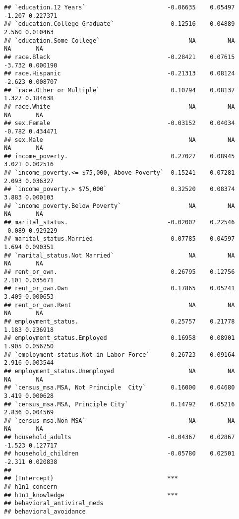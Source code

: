 \documentclass[
]{article}
\begin{document}
\begin{verbatim}
## `education.12 Years`                       -0.06635    0.05497  -1.207 0.227371
## `education.College Graduate`                0.12516    0.04889   2.560 0.010463
## `education.Some College`                         NA         NA      NA       NA
## race.Black                                 -0.28421    0.07615  -3.732 0.000190
## race.Hispanic                              -0.21313    0.08124  -2.623 0.008707
## `race.Other or Multiple`                    0.10794    0.08137   1.327 0.184638
## race.White                                       NA         NA      NA       NA
## sex.Female                                 -0.03152    0.04034  -0.782 0.434471
## sex.Male                                         NA         NA      NA       NA
## income_poverty.                             0.27027    0.08945   3.021 0.002516
## `income_poverty.<= $75,000, Above Poverty`  0.15241    0.07281   2.093 0.036327
## `income_poverty.> $75,000`                  0.32520    0.08374   3.883 0.000103
## `income_poverty.Below Poverty`                   NA         NA      NA       NA
## marital_status.                            -0.02002    0.22546  -0.089 0.929229
## marital_status.Married                      0.07785    0.04597   1.694 0.090351
## `marital_status.Not Married`                     NA         NA      NA       NA
## rent_or_own.                                0.26795    0.12756   2.101 0.035671
## rent_or_own.Own                             0.17865    0.05241   3.409 0.000653
## rent_or_own.Rent                                 NA         NA      NA       NA
## employment_status.                          0.25757    0.21778   1.183 0.236918
## employment_status.Employed                  0.16958    0.08901   1.905 0.056750
## `employment_status.Not in Labor Force`      0.26723    0.09164   2.916 0.003544
## employment_status.Unemployed                     NA         NA      NA       NA
## `census_msa.MSA, Not Principle  City`       0.16000    0.04680   3.419 0.000628
## `census_msa.MSA, Principle City`            0.14792    0.05216   2.836 0.004569
## `census_msa.Non-MSA`                             NA         NA      NA       NA
## household_adults                           -0.04367    0.02867  -1.523 0.127717
## household_children                         -0.05780    0.02501  -2.311 0.020838
##                                               
## (Intercept)                                ***
## h1n1_concern                                  
## h1n1_knowledge                             ***
## behavioral_antiviral_meds                     
## behavioral_avoidance                          

\end{verbatim}
\end{document}
